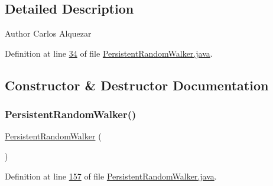 \subsection{Detailed Description}
\begin{DoxyAuthor}{Author}
Carlos Alquezar 
\end{DoxyAuthor}


Definition at line \hyperlink{_persistent_random_walker_8java_source_l00034}{34} of file \hyperlink{_persistent_random_walker_8java_source}{Persistent\+Random\+Walker.\+java}.



\subsection{Constructor \& Destructor Documentation}
\hypertarget{classdata_1_1_persistent_random_walker_ad49e0fa12d71d15eb1090e4e77c9f197}{}\label{classdata_1_1_persistent_random_walker_ad49e0fa12d71d15eb1090e4e77c9f197} 
\subsubsection{\texorpdfstring{Persistent\+Random\+Walker()}{PersistentRandomWalker()}\hspace{0.1cm}{\footnotesize\ttfamily [1/3]}}
{\footnotesize\ttfamily \hyperlink{classdata_1_1_persistent_random_walker}{Persistent\+Random\+Walker} (\begin{DoxyParamCaption}{ }\end{DoxyParamCaption})}



Definition at line \hyperlink{_persistent_random_walker_8java_source_l00157}{157} of file \hyperlink{_persistent_random_walker_8java_source}{Persistent\+Random\+Walker.\+java}.

\hypertarget{classdata_1_1_persistent_random_walker_a418219e73f9dc7ff97094ab05696dfa4}{}\label{classdata_1_1_persistent_random_walker_a418219e73f9dc7ff97094ab05696dfa4} 
